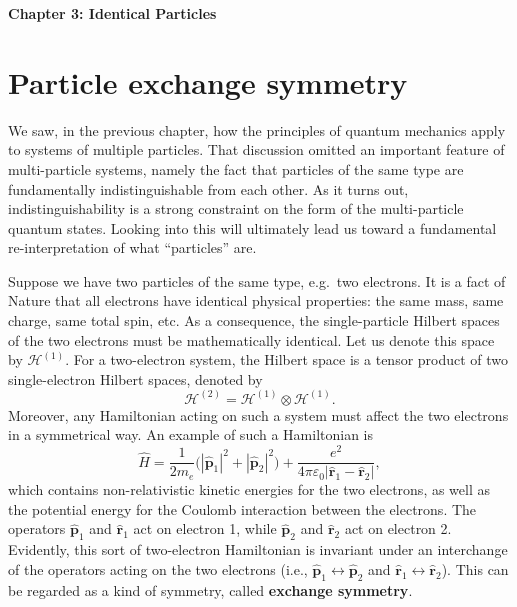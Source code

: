 \documentclass[pra,12pt]{revtex4}
\begin{document}
\begin{center}
{\Large \textbf{Chapter 3: Identical Particles}}
\end{center}

\section{Particle exchange symmetry}

We saw, in the previous chapter, how the principles of quantum
mechanics apply to systems of multiple particles.  That discussion
omitted an important feature of multi-particle systems, namely the
fact that particles of the same type are fundamentally
indistinguishable from each other.  As it turns out,
indistinguishability is a strong constraint on the form of the
multi-particle quantum states.  Looking into this will ultimately lead
us toward a fundamental re-interpretation of what ``particles'' are.

Suppose we have two particles of the same type, e.g.~two electrons.
It is a fact of Nature that all electrons have identical physical
properties: the same mass, same charge, same total spin, etc.  As a
consequence, the single-particle Hilbert spaces of the two electrons
must be mathematically identical.  Let us denote this space by
$\mathscr{H}^{(1)}$.  For a two-electron system, the Hilbert space is
a tensor product of two single-electron Hilbert spaces, denoted by
$$\mathscr{H}^{(2)} = \mathscr{H}^{(1)} \otimes \mathscr{H}^{(1)}.$$
Moreover, any Hamiltonian acting on such a system must affect the two
electrons in a symmetrical way.  An example of such a Hamiltonian is
$$\hat{H} = \frac{1}{2m_e} \Big(|\hat{\mathbf{p}}_1|^2 + |\hat{\mathbf{p}}_2|^2\Big) + \frac{e^2}{4\pi\varepsilon_0|\hat{\mathbf{r}}_1 - \hat{\mathbf{r}}_2|},$$
which contains non-relativistic kinetic energies for the two
electrons, as well as the potential energy for the Coulomb interaction
between the electrons.  The operators $\hat{\mathbf{p}}_1$ and
$\hat{\mathbf{r}}_1$ act on electron 1, while $\hat{\mathbf{p}}_2$ and
$\hat{\mathbf{r}}_2$ act on electron 2.  Evidently, this sort of
two-electron Hamiltonian is invariant under an interchange of the
operators acting on the two electrons (i.e., $\hat{\mathbf{p}}_1
\leftrightarrow \hat{\mathbf{p}}_2$ and $\hat{\mathbf{r}}_1
\leftrightarrow \hat{\mathbf{r}}_2$).  This can be regarded as a
kind of symmetry, called \textbf{exchange symmetry}.
\end{document}
